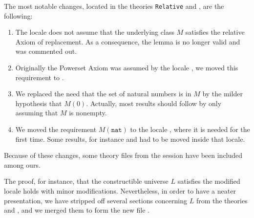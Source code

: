 The most notable changes, located in the theories \texttt{Relative}
and , are
the following:
\begin{enumerate}
\item\label{item:1} The locale 
  does not assume that the underlying class $M$ satisfies the relative
  Axiom of replacement.  As a consequence, the lemma
   is no longer valid and was commented
  out.
\item\label{item:2}  Originally the Powerset Axiom was assumed by the
  locale ,   we moved this requirement to . 
\item\label{item:3} We replaced the need that the set of natural
  numbers is in $M$ by the   milder hypothesis that $M(0)$. Actually,
  most results should follow 
  by only assuming that $M$ is nonempty.
\item We moved the requirement $M(\mathtt{nat})$ to the locale
  , where it is needed for the first time. Some results,
  for instance  and 
   had to be moved inside that
  locale. 
\end{enumerate}
Because of these changes, some theory files from the
 session have been included among ours.

The proof, for instance, that the constructible universe $L$ satisfies
the modified locale  holds with minor
modifications. Nevertheless, in order to have a neater presentation,
we have stripped off several sections concerning $L$ from the theories
 and , and we merged them to form
the new file  . 

